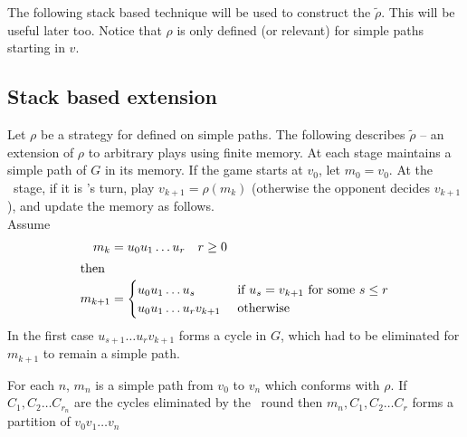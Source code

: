 The following stack based technique will be used to construct the $\tilde{\rho}$. This will be useful later too. Notice that $\rho$ is only defined (or relevant) for simple paths starting in $v$.

\subsection{Stack based extension}
\label{sec:stack}
Let $\rho$ be a strategy for  defined on simple paths. The following describes $ \tilde{\rho}$ -- an extension of $\rho$ to arbitrary plays using finite memory. At each stage  maintains a simple path of $G$ in its memory. If the game starts at $v_0$, let $m_0=v_0$. At the \nth[k+1]\ stage, if it is 's turn, play $v_{k+1}=\rho(m_k)$ (otherwise the opponent decides $v_{k+1}$), and update the memory as follows.\\
Assume
\begin{align*}
    m_k &=u_0 u_1 \ldots u_r \quad r \geq 0\\
    \intertext{then}
    m_{k+1}&=\begin{cases}
        u_0 u_1 \ldots u_s & \text{ if } u_s = v_{k+1} \text{ for some } s \leq r \\
        u_0  u_1 \ldots u_r v_{k+1} & \text{ otherwise }
        \end{cases}
\end{align*}
In the first case $u_{s+1} \ldots u_r v_{k+1}$ forms a cycle in $G$, which had to be eliminated for $m_{k+1}$ to remain a simple path.

For each $n$, $m_n$ is a simple path from $v_0$ to $v_n$ which conforms with $\rho$. If $C_1,C_2 \ldots C_{r_n}$ are the cycles eliminated by the \nth\ round then $m_n, C_1, C_2 \ldots C_r$ forms a partition of $v_0v_1 \ldots v_n$


